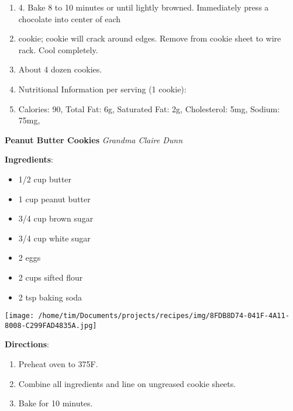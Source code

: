 \documentclass[11pt, twoside, openany]{book}
\begin{document}
\begin{minipage}[t]{\linewidth}
\begin{enumerate}
\item 4. Bake 8 to 10 minutes or until lightly browned. Immediately press a chocolate into center of each
\item cookie; cookie will crack around edges. Remove from cookie sheet to wire rack. Cool completely.
\item About 4 dozen cookies.
\item Nutritional Information per serving (1 cookie):
\item Calories: 90, Total Fat: 6g, Saturated Fat: 2g, Cholesterol: 5mg, Sodium: 75mg,
\end{enumerate}
\end{minipage}\vspace{8mm}
\noindent\begin{minipage}[t]{\linewidth}%
{\Large\textbf{Peanut Butter Cookies}} \label{peanut-butter-cookies}\hfill\textit{Grandma Claire Dunn}\\
\noindent\begin{minipage}[t]{0.78\linewidth}%
\textbf{Ingredients}:\vspace{-3mm}
\begin{multicols}{2}
\begin{itemize}\setlength\itemsep{-1mm}
\item 1/2 cup butter
\item 1 cup peanut butter
\item 3/4 cup brown sugar
\item 3/4 cup white sugar
\item 2 eggs
\item 2 cups sifted flour
\item 2 tsp baking soda
\end{itemize}
\end{multicols}
\end{minipage}
\noindent\begin{minipage}[t]{0.18\linewidth}
\centering \strut\vspace*{-\baselineskip}\newline
\texttt{[image: /home/tim/Documents/projects/recipes/img/8FDB8D74-041F-4A11-8008-C299FAD4835A.jpg]}\\
\end{minipage}\vspace{3mm}
\textbf{Directions}:
\vspace{-3mm}\begin{enumerate}\setlength\itemsep{-1mm}
\item Preheat oven to 375F.
\item Combine all ingredients and line on ungreased cookie sheets.
\item Bake for 10 minutes.
\end{enumerate}
\end{minipage}\vspace{8mm}
\end{document}
